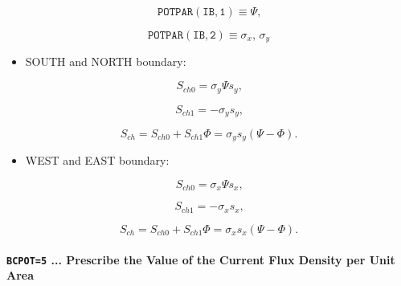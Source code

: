\documentclass[11pt]{article}
\begin{document}
\bigskip

\begin{equation*}
\mathtt{POTPAR(IB,1)}\equiv\Psi\text{,}
\end{equation*}

\begin{equation*}
\mathtt{POTPAR(IB,2)}\equiv\sigma_{x}\text{, }\sigma_{y}
\end{equation*}

\bigskip

\begin{itemize}
\item  SOUTH and NORTH boundary:
\end{itemize}

\begin{equation}
S_{ch0}=\sigma_{y}\Psi s_{y}\text{,}   \label{c324}
\end{equation}

\begin{equation}
S_{ch1}=-\sigma_{y}s_{y}\text{,}   \label{c325}
\end{equation}

\begin{equation}
S_{ch}=S_{ch0}+S_{ch1}\Phi=\sigma_{y}s_{y}\left( \Psi-\Phi\right) \text{.} 
\label{c326}
\end{equation}

\bigskip

\begin{itemize}
\item  WEST and EAST boundary:
\end{itemize}

\begin{equation}
S_{ch0}=\sigma_{x}\Psi s_{x}\text{,}   \label{c327}
\end{equation}

\begin{equation}
S_{ch1}=-\sigma_{x}s_{x}\text{,}   \label{c328}
\end{equation}

\begin{equation}
S_{ch}=S_{ch0}+S_{ch1}\Phi=\sigma_{x}s_{x}\left( \Psi-\Phi\right) \text{.} 
\label{c329}
\end{equation}

\bigskip

\bigskip

\paragraph{\texttt{BCPOT=5} ... Prescribe the Value of the Current Flux
Density per Unit Area}
\end{document}
